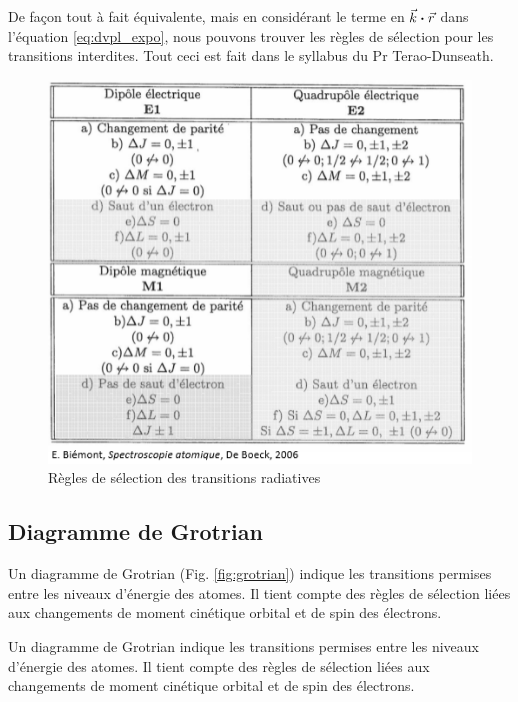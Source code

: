 De façon tout à fait équivalente, mais en considérant le terme en $\vec{k}\boldsymbol{\cdot}\vec{r}$ dans l'équation \eqref{eq:dvpl_expo}, nous pouvons trouver les règles de sélection pour les transitions interdites. Tout ceci est fait dans le syllabus du Pr Terao-Dunseath.


\begin{figure}[htp]
    \centering
    \includegraphics[scale=0.8]{Images2/regles.PNG}
    \caption{Règles de sélection des transitions radiatives}
    \label{fig:regles_transision_radiatives}
\end{figure}

\subsection{Diagramme de Grotrian}
Un diagramme de Grotrian (Fig. \ref{fig:grotrian}) indique les transitions permises entre les niveaux d'énergie des atomes. Il tient compte des règles de sélection liées aux changements de moment cinétique orbital et de spin des électrons.

Un diagramme de Grotrian indique les transitions permises entre les niveaux d'énergie des atomes. Il tient compte des règles de sélection liées aux changements de moment cinétique orbital et de spin des électrons.

